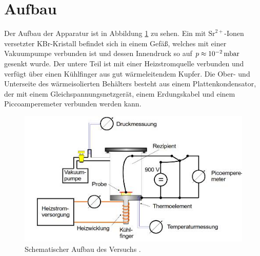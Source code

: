 \section{Aufbau}
\label{sec:Aufbau}

Der Aufbau der Apparatur ist in Abbildung \ref{fig:Aufbau} zu sehen.
Ein mit $\mathrm{Sr}^{2+}$-Ionen versetzter KBr-Kristall befindet sich in einem Gefäß, welches mit einer Vakuumpumpe verbunden ist und dessen Innendruck so auf $p\approx\SI{E-2}{\milli\bar}$ gesenkt wurde. Der untere Teil ist mit einer Heizstromquelle verbunden und verfügt über einen Kühlfinger aus gut wärmeleitendem Kupfer.
Die Ober- und Unterseite des wärmeisolierten Behälters besteht aus einem Plattenkondensator, der mit einem Gleichspannungsnetzgerät, einem Erdungskabel und einem Piccoamperemeter verbunden werden kann.

\begin{figure}
	\centering
	\includegraphics[width=\linewidth-70pt,height=\textheight-70pt,keepaspectratio]{content/images/Aufbau.jpg}
	\caption{Schematischer Aufbau des Versuchs \cite{V48}.}
	\label{fig:Aufbau}
\end{figure}
